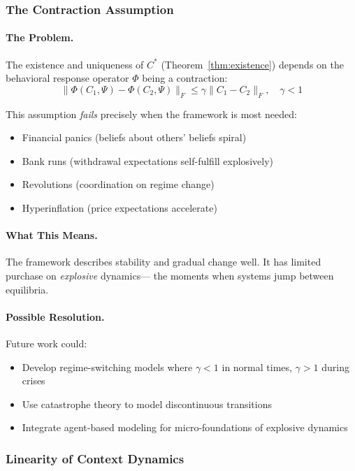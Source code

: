 \documentclass[12pt,a4paper]{article}
\begin{document}
\subsubsection{The Contraction Assumption}

\paragraph{The Problem.}
The existence and uniqueness of $C^*$ (Theorem~\ref{thm:existence}) depends on 
the behavioral response operator $\Phi$ being a contraction:
\begin{equation}
  \|\Phi(C_1, \Psi) - \Phi(C_2, \Psi)\|_F \leq \gamma \|C_1 - C_2\|_F, \quad \gamma < 1
\end{equation}

This assumption \emph{fails} precisely when the framework is most needed:
\begin{itemize}
  \item Financial panics (beliefs about others' beliefs spiral)
  \item Bank runs (withdrawal expectations self-fulfill explosively)
  \item Revolutions (coordination on regime change)
  \item Hyperinflation (price expectations accelerate)
\end{itemize}

\paragraph{What This Means.}
The framework describes stability and gradual change well.
It has limited purchase on \emph{explosive} dynamics---
the moments when systems jump between equilibria.

\paragraph{Possible Resolution.}
Future work could:
\begin{itemize}
  \item Develop regime-switching models where $\gamma < 1$ in normal times, $\gamma > 1$ during crises
  \item Use catastrophe theory to model discontinuous transitions
  \item Integrate agent-based modeling \citep{tesfatsion2006} for micro-foundations of explosive dynamics
\end{itemize}

\subsubsection{Linearity of Context Dynamics}
\end{document}
